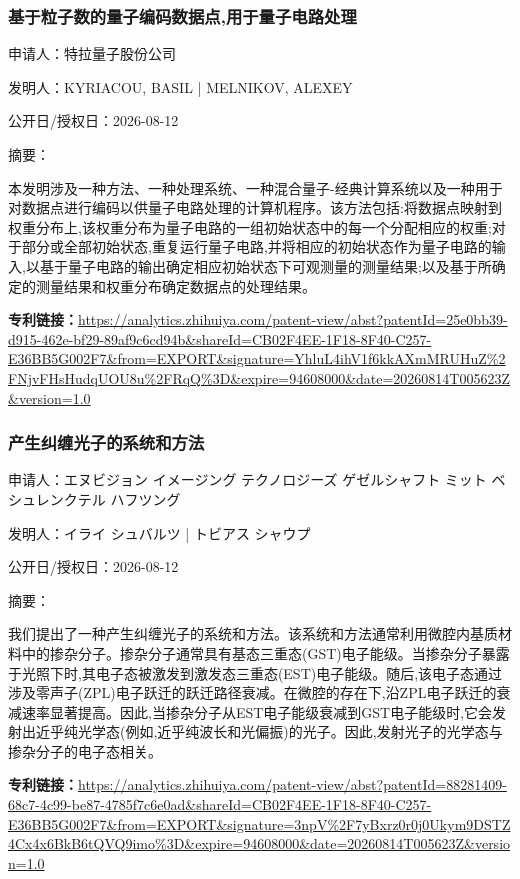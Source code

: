 \documentclass[12pt,a4paper]{ctexart}
\begin{document}
\subsubsection{ 基于粒子数的量子编码数据点,用于量子电路处理 }

申请人：特拉量子股份公司

发明人：KYRIACOU, BASIL | MELNIKOV, ALEXEY

公开日/授权日：2026-08-12

摘要：

本发明涉及一种方法、一种处理系统、一种混合量子-经典计算系统以及一种用于对数据点进行编码以供量子电路处理的计算机程序。该方法包括:将数据点映射到权重分布上,该权重分布为量子电路的一组初始状态中的每一个分配相应的权重;对于部分或全部初始状态,重复运行量子电路,并将相应的初始状态作为量子电路的输入,以基于量子电路的输出确定相应初始状态下可观测量的测量结果;以及基于所确定的测量结果和权重分布确定数据点的处理结果。

\noindent\textbf{专利链接：}\url{https://analytics.zhihuiya.com/patent-view/abst?patentId=25e0bb39-d915-462e-bf29-89af9c6cd94b&shareId=CB02F4EE-1F18-8F40-C257-E36BB5G002F7&from=EXPORT&signature=YhluL4ihV1f6kkAXmMRUHuZ%2FNjvFHsHudqUOU8u%2FRqQ%3D&expire=94608000&date=20260814T005623Z&version=1.0}

\subsubsection{ 产生纠缠光子的系统和方法 }

申请人：エヌビジョン イメージング テクノロジーズ ゲゼルシャフト ミット ベシュレンクテル ハフツング

发明人：イライ シュバルツ | トビアス シャウプ

公开日/授权日：2026-08-12

摘要：

我们提出了一种产生纠缠光子的系统和方法。该系统和方法通常利用微腔内基质材料中的掺杂分子。掺杂分子通常具有基态三重态(GST)电子能级。当掺杂分子暴露于光照下时,其电子态被激发到激发态三重态(EST)电子能级。随后,该电子态通过涉及零声子(ZPL)电子跃迁的跃迁路径衰减。在微腔的存在下,沿ZPL电子跃迁的衰减速率显著提高。因此,当掺杂分子从EST电子能级衰减到GST电子能级时,它会发射出近乎纯光学态(例如,近乎纯波长和光偏振)的光子。因此,发射光子的光学态与掺杂分子的电子态相关。

\noindent\textbf{专利链接：}\url{https://analytics.zhihuiya.com/patent-view/abst?patentId=88281409-68c7-4c99-be87-4785f7c6e0ad&shareId=CB02F4EE-1F18-8F40-C257-E36BB5G002F7&from=EXPORT&signature=3npV%2F7yBxrz0r0j0Ukym9DSTZ4Cx4x6BkB6tQVQ9imo%3D&expire=94608000&date=20260814T005623Z&version=1.0}
\end{document}
